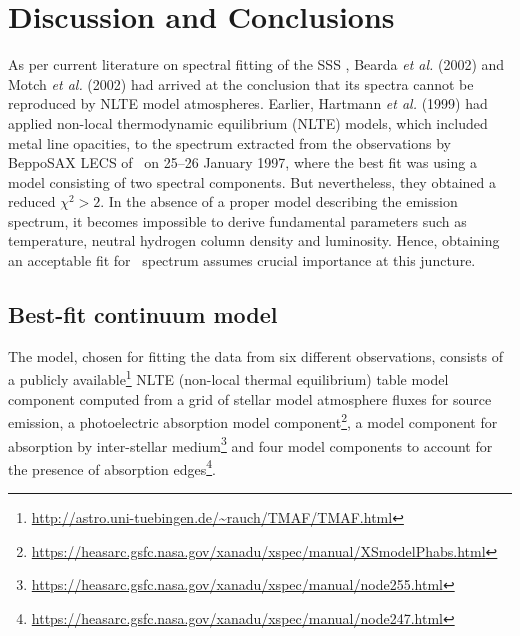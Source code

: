 \section{Discussion and Conclusions}
	As per current literature on spectral fitting of the SSS \source, Bearda \textit{et al.} (2002) and Motch \textit{et al.} (2002) had arrived at the conclusion that its spectra cannot be reproduced by NLTE model atmospheres. %
	Earlier, Hartmann \textit{et al.} (1999) had applied non-local thermodynamic equilibrium (NLTE) models, which included metal line opacities, to the spectrum extracted from the observations by BeppoSAX LECS of \source\ on 25--26 January 1997, %
	where the best fit was using a model consisting of two spectral components. But nevertheless, they obtained a reduced $\chi^2>2$. In the absence of a proper model describing the emission spectrum, it becomes impossible to derive fundamental parameters such as temperature, neutral hydrogen column density and luminosity. %
	Hence, obtaining an acceptable fit for \source\ spectrum assumes crucial importance at this juncture.
%			
	
	\subsection{Best-fit continuum model}
	The model, chosen for fitting the data from six different observations, consists of a publicly available\footnote{\url{http://astro.uni-tuebingen.de/~rauch/TMAF/TMAF.html}} NLTE (non-local thermal equilibrium) table model component computed from a grid of stellar model atmosphere fluxes for source emission, a photoelectric absorption model component\footnote{\url{https://heasarc.gsfc.nasa.gov/xanadu/xspec/manual/XSmodelPhabs.html}}, a model component for absorption by inter-stellar medium\footnote{\url{https://heasarc.gsfc.nasa.gov/xanadu/xspec/manual/node255.html}} and four model components to account for the presence of absorption edges\footnote{\url{https://heasarc.gsfc.nasa.gov/xanadu/xspec/manual/node247.html}}.
	

